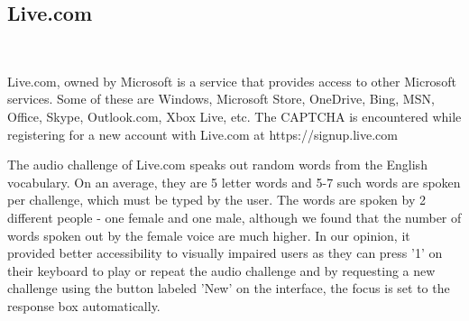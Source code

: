 \subsection{Live.com} \mbox{} \	

Live.com, owned by Microsoft is a service that provides access to other Microsoft services. Some of these are Windows, Microsoft Store, OneDrive, Bing, MSN, Office, Skype, Outlook.com, Xbox Live, etc. The CAPTCHA is encountered while registering for a new account with Live.com at https://signup.live.com \newline

The audio challenge of Live.com speaks out random words from the English vocabulary. On an average, they are 5 letter words and 5-7 such words are spoken per challenge, which must be typed by the user. The words are spoken by 2 different people - one female and one male, although we found that the number of words spoken out by the female voice are much higher. In our opinion, it provided better accessibility to visually impaired users as they can press '1' on their keyboard to play or repeat the audio challenge and by requesting a new challenge using the button labeled 'New' on the interface, the focus is set to the response box automatically.
